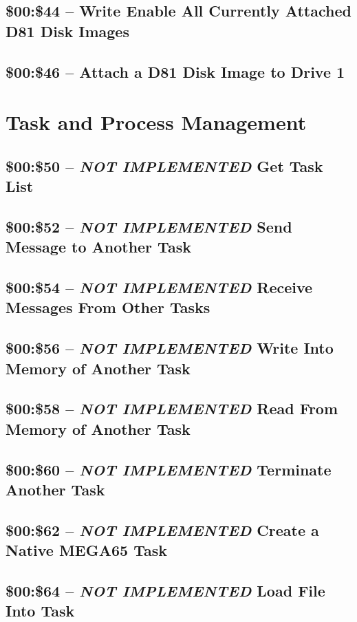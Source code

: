 \subsection{\$00:\$44 -- Write Enable All Currently Attached D81 Disk Images}
\subsection{\$00:\$46 -- Attach a D81 Disk Image to Drive 1}

\section{Task and Process Management}

\subsection{\$00:\$50 -- {\em NOT IMPLEMENTED} Get Task List}
\subsection{\$00:\$52 -- {\em NOT IMPLEMENTED} Send Message to Another Task}
\subsection{\$00:\$54 -- {\em NOT IMPLEMENTED} Receive Messages From Other Tasks}
\subsection{\$00:\$56 -- {\em NOT IMPLEMENTED} Write Into Memory of Another Task}
\subsection{\$00:\$58 -- {\em NOT IMPLEMENTED} Read From Memory of Another Task}

\subsection{\$00:\$60 -- {\em NOT IMPLEMENTED} Terminate Another Task}
\subsection{\$00:\$62 -- {\em NOT IMPLEMENTED} Create a Native MEGA65 Task}
\subsection{\$00:\$64 -- {\em NOT IMPLEMENTED} Load File Into Task}
